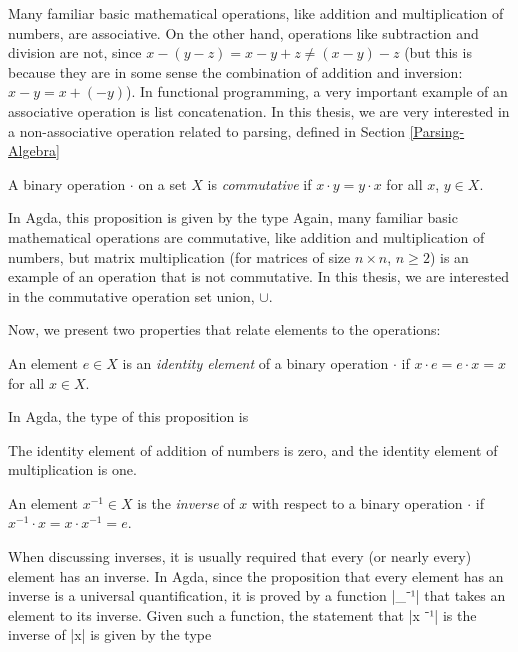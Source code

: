 Many familiar basic mathematical operations, like addition and multiplication of numbers, are associative. On the other hand, operations like subtraction and division are not, since $x - (y - z) = x - y + z \ne (x - y) - z$ (but this is because they are in some sense the combination of addition and inversion: $x - y = x + (-y)$). In functional programming, a very important example of an associative operation is list concatenation.
In this thesis, we are very interested in a non-associative operation related to parsing, defined in Section \ref{Parsing-Algebra}



\begin{Definition} %
A binary operation $\cdot$ on a set $X$ is \emph{commutative} if $x \cdot y = y \cdot x$ for all $x$, $y \in X$.
\end{Definition}
In Agda, this proposition is given by the type
Again, many familiar basic mathematical operations are commutative, like addition and multiplication of numbers, but matrix multiplication (for matrices of size $n \times n$, $n \ge 2$) is an example of an operation that is not commutative.
In this thesis, we are interested in the commutative operation set union, $\cup$.

Now, we present two properties that relate elements to the operations:
\begin{Definition} %
  An element $e \in X$ is an \emph{identity element} of a binary operation $\cdot$ if $x \cdot e = e \cdot x = x$ for all $x \in X$.
\end{Definition}
In Agda, the type of this proposition is

The identity element of addition of numbers is zero, and the identity element of multiplication is one.

\begin{Definition}
An element $x^{-1} \in X$ is the \emph{inverse} of $x$ with respect to a binary operation $\cdot$ if $x^{-1} \cdot x = x \cdot x^{-1} = e$.
\end{Definition}
When discussing inverses, it is usually required that every (or nearly every) element has an inverse.
In Agda, since the proposition that every element has an inverse is a universal quantification, it is proved by a function |_⁻¹| that takes an element to its inverse. Given such a function, the statement that |x ⁻¹| is the inverse of |x| is given by the type

